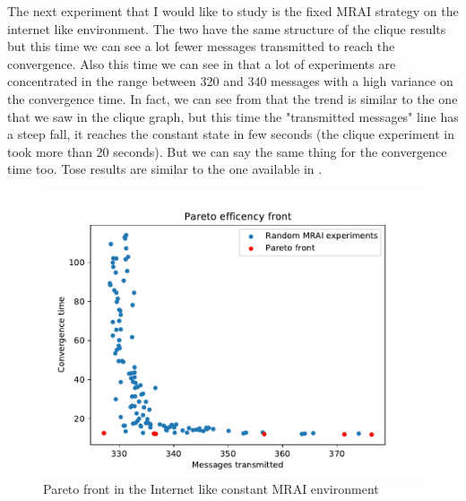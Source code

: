 \documentclass[10pt,conference,letterpaper]{IEEEtran}
\newcommand{\figwidth}{0.78}
\newcommand{\figvspace}{-1.5em}
\begin{document}
The next experiment that I would like to study is the fixed \ac{MRAI} strategy
on the internet like environment.
The two  have the
same structure of the clique results but this time we can see a lot fewer messages
transmitted to reach the convergence.
Also this time we can see in  that a lot of
experiments are concentrated in the range between \num{320} and \num{340} messages
with a high variance on the convergence time.
In fact, we can see from  that the trend is similar
to the one that we saw in the clique graph, but this time the "transmitted messages" line
has a steep fall, it reaches the constant state in few seconds (the clique experiment
in  took more than \num{20} seconds).
But we can say the same thing for the convergence time too.
Tose results are similar to the one available in \cite{griffin2001experimental}.

\begin{figure}[tb]
	\centering
	\includegraphics[width=\figwidth\columnwidth]{images/internet_like/graph-100-constant/pareto-constant}
	\caption{Pareto front in the Internet like constant \ac{MRAI} environment}
	\label{fig:constant_mrai_pareto_freq}
	\vspace{\figvspace}
\end{figure}
\end{document}

